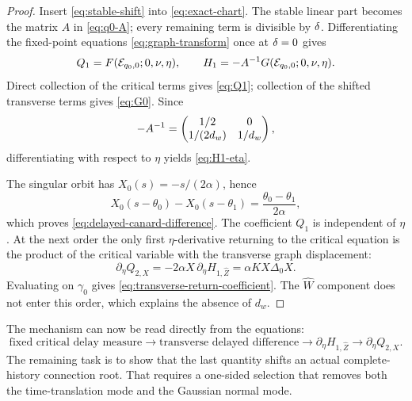 \begin{proof}
Insert \cref{eq:stable-shift} into \cref{eq:exact-chart}.  The stable
linear part becomes the matrix \(A\) in \cref{eq:q0-A}; every remaining
term is divisible by \(\delta\).  Differentiating the fixed-point equations
\cref{eq:graph-transform} once at \(\delta=0\) gives
\begin{equation}
 Q_1=F(\mathcal E_{q_0,0};0,\nu,\eta),
 \qquad H_1=-A^{-1}G(\mathcal E_{q_0,0};0,\nu,\eta).
\end{equation}
Direct collection of the critical terms gives \cref{eq:Q1}; collection of
the shifted transverse terms gives \cref{eq:G0}.  Since
\[
 -A^{-1}=\begin{pmatrix}1/2&0\\1/(2d_w)&1/d_w\end{pmatrix},
\]
differentiating with respect to \(\eta\) yields
\cref{eq:H1-eta}.

The singular orbit has \(X_0(s)=-s/(2\alpha)\), hence
\[
 X_0(s-\theta_0)-X_0(s-\theta_1)
 =\frac{\theta_0-\theta_1}{2\alpha},
\]
which proves \cref{eq:delayed-canard-difference}.  The coefficient \(Q_1\)
is independent of \(\eta\).  At the next order the only first
\(\eta\)-derivative returning to the critical equation is the product of
the critical variable with the transverse graph displacement:
\[
 \partial_\eta Q_{2,X}
 =-2\alpha X\,\partial_\eta H_{1,\widehat Z}
 =\alpha KX\Delta_0X.
\]
Evaluating on \(\gamma_0\) gives
\cref{eq:transverse-return-coefficient}.  The \(\widehat W\) component
does not enter this order, which explains the absence of \(d_w\).
\end{proof}

The mechanism can now be read directly from the equations:
\[
 \text{fixed critical delay measure}
 \longrightarrow
 \text{transverse delayed difference}
 \longrightarrow
 \partial_\eta H_{1,\widehat Z}
 \longrightarrow
 \partial_\eta Q_{2,X}.
\]
The remaining task is to show that the last quantity shifts an actual
complete-history connection root.  That requires a one-sided selection that
removes both the time-translation mode and the Gaussian normal mode.
